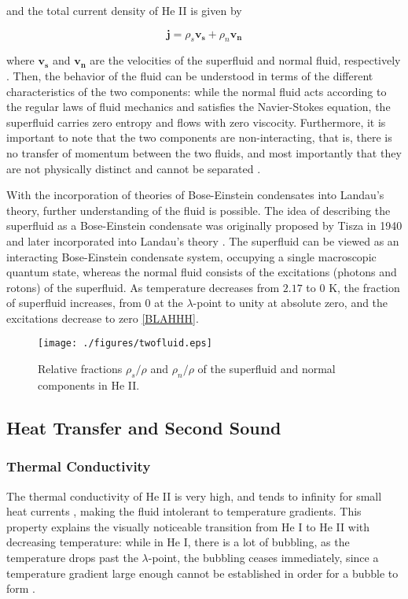 and the total current density of He II is given by

\begin{equation}
\mathbf{j} = \rho_s\mathbf{v_s} + \rho_n\mathbf{v_n}
\end{equation}

where $\mathbf{v_s}$ and $\mathbf{v_n}$ are the velocities of the
superfluid and normal fluid, respectively \cite{tilley}. Then, the
behavior of the fluid can be understood in terms of the different
characteristics of the two components: while the normal fluid acts
according to the regular laws of fluid mechanics and satisfies the
Navier-Stokes equation, the superfluid carries zero entropy and flows
with zero viscocity. Furthermore, it is important to note that the two
components are non-interacting, that is, there is no transfer of
momentum between the two fluids, and most importantly that they are
not physically distinct and cannot be separated \cite{tilley}.

With the incorporation of theories of Bose-Einstein condensates into
Landau's theory, further understanding of the fluid is possible. The
idea of describing the superfluid as a Bose-Einstein condensate was
originally proposed by Tisza in 1940 and later incorporated into
Landau's theory \cite{tisza}. The superfluid can be viewed as an
interacting Bose-Einstein condensate system, occupying a single
macroscopic quantum state, whereas the normal fluid consists of the
excitations (photons and rotons) of the superfluid. As temperature
decreases from $2.17$ to $0$ K, the fraction of superfluid increases,
from $0$ at the $\lambda$-point to unity at absolute zero, and the
excitations decrease to zero \ref{BLAHHH}.


\begin{figure}[ht]
\begin{center}
\texttt{[image: ./figures/twofluid.eps]}
\caption{\small{Relative fractions $\rho_s/\rho$ and $\rho_n/\rho$ of
   the superfluid and normal components in He II.}}
\label{figure:twofluid}
\end{center}
\end{figure}



\subsection{Heat Transfer and Second Sound}

\subsubsection{Thermal Conductivity}
The thermal conductivity of He II is very high, and tends to infinity
for small heat currents \cite{tilley}, making the fluid intolerant
to temperature gradients. This property explains the visually
noticeable transition from He I to He II with decreasing temperature:
while in He I, there is a lot of bubbling, as the temperature drops
past the $\lambda$-point, the bubbling ceases immediately, since a
temperature gradient large enough cannot be established in order for a
bubble to form \cite{tilley}.


